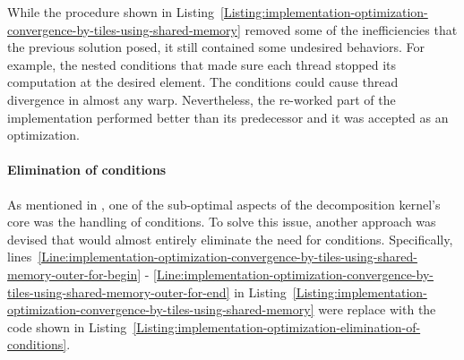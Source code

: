 While the procedure shown in Listing~\ref{Listing:implementation-optimization-convergence-by-tiles-using-shared-memory} removed some of the inefficiencies that the previous solution posed, it still contained some undesired behaviors. For example, the nested conditions that made sure each thread stopped its computation at the desired element. The conditions could cause thread divergence in almost any warp. Nevertheless, the re-worked part of the implementation performed better than its predecessor and it was accepted as an optimization.

\paragraph{Elimination of conditions}\label{Paragraph:implementation-optimization-elimination-of-conditions}
As mentioned in \textit{}, one of the sub-optimal aspects of the decomposition kernel's core was the handling of conditions. To solve this issue, another approach was devised that would almost entirely eliminate the need for conditions. Specifically, lines~\ref{Line:implementation-optimization-convergence-by-tiles-using-shared-memory-outer-for-begin} - \ref{Line:implementation-optimization-convergence-by-tiles-using-shared-memory-outer-for-end} in Listing~\ref{Listing:implementation-optimization-convergence-by-tiles-using-shared-memory} were replace with the code shown in Listing~\ref{Listing:implementation-optimization-elimination-of-conditions}.

